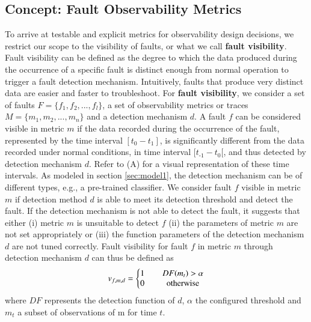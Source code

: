 \subsection{Concept: Fault Observability Metrics}\label{sec:metrics}
To arrive at testable and explicit metrics for observability design decisions, we restrict our scope to the visibility of faults, or what we call \textbf{fault visibility}\cite{Borges_TracingServerless_2021}. Fault visibility can be defined as the degree to which the data produced during the occurrence of a specific fault is distinct enough from normal operation to trigger a fault detection mechanism. 
Intuitively, faults that produce very distinct data are easier and faster to troubleshoot. 
For \textbf{fault visibility}, we consider a set of faults $ F = \{f_1, f_2, ..., f_l\}$, a set of observability metrics or traces $M = \{m_{1},m_{2},...,m_{n}\}$ and a detection mechanism $d$. A fault $f$ can be considered visible in metric $m$ if the data recorded during the occurrence of the fault, represented by the time interval $[t_{0} - t_{1}]$, is significantly different from the data recorded under normal conditions, in time interval $[t_{\text{-}1} - t_{0}[$, and thus detected by detection mechanism $d$. Refer to (A) for a visual representation of these time intervals. 
As modeled in section \ref{sec:model1}, the detection mechanism can be of different types, e.g., a pre-trained classifier. We consider fault $f$ visible in metric $m$ if detection method $d$ is able to meet its detection threshold and detect the fault. If the detection mechanism is not able to detect the fault, it suggests that either (i) metric $m$ is unsuitable to detect $f$ (ii) the parameters of metric $m$ are not set appropriately or (iii) the function parameters of the detection mechanism $d$ are not tuned correctly. Fault visibility for fault $f$ in metric $m$ through detection mechanism $d$ can thus be defined as
\begin{equation}
    v_{f,m,d}=\left\{
    \setlength{\arraycolsep}{0.2cm}
    \begin{matrix} 
     1 & \quad  DF(m_{t}) > \alpha \\  
     0 & \quad \text{otherwise}  \\ 
    \end{matrix}\right.
\end{equation}
where $DF$ represents the detection function of $d$, $\alpha$ the configured threshold and $m_t$ a subset of observations of m for time $t$. 


